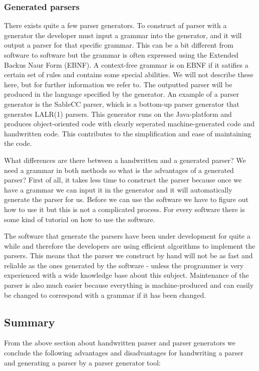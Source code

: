 \subsubsection{Generated parsers}
\label{subsec:generatedparsers}
There exists quite a few parser generators. To construct af parser with a
generator the developer must input a grammar into the generator, and it will
output a parser for that specific grammar. This can be a bit different from
software to software but the grammar is often expressed using the Extended
Backus Naur Form (EBNF). A context-free grammar is on EBNF if it satifies a
certain set of rules and contains some special abilities. We will not describe
these here, but for further information we refer to.
\cite[152]{fischer2009} 
The outputted parser will be produced in the language specified by the
generator. An example of a parser generator is the SableCC parser, which is a
bottom-up parser generator that generates LALR(1) parsers. This generator runs
on the Java-platform and produces object-oriented code with clearly seperated
machine-generated code and handwritten code. This contributes to the
simplification and ease of maintaining the code.
\cite[p. 11]{sableccdoc}

What differences are there between a handwritten and a generated parser? We need
a grammar in both methods so what is the advantages of a generated parser? First
of all, it takes less time to construct the parser because once we have a
grammar we can input it in the generator and it will automatically generate the
parser for us. Before we can use the software we have to figure out how to use
it but this is not a complicated process. For every software there is some kind
of tutorial on how to use the software.

The software that generate the parsers have been under development for quite a
while and therefore the developers are using efficient algorithms to implement
the parsers. This means that the parser we construct by hand will not be as fast
and reliable as the ones generated by the software - unless the programmer is
very experienced with a wide knowledge base about this subject. Maintenance of
the parser is also much easier because everything is machine-produced and can
easily be changed to correspond with a grammar if it has been changed.

\subsection{Summary}
\label{subsec:summary-parser}
From the above section about handwritten parser and parser generators we
conclude the following advantages and disadvantages for handwriting a parser and
generating a parser by a parser generator tool:

